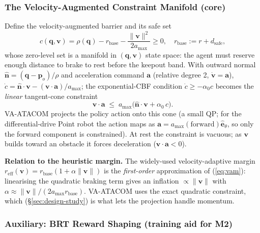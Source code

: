 \documentclass[letterpaper]{article}
\begin{document}
\subsubsection{The Velocity-Augmented Constraint Manifold (core)}

Define the velocity-augmented barrier and its safe set
\begin{equation}
c(\boldsymbol{q},\boldsymbol{v}) = \rho(\boldsymbol{q}) - r_\text{base} - \frac{\|\boldsymbol{v}\|^2}{2a_{\max}} \ge 0,\quad r_\text{base} := r + d_\text{safe},
\label{eq:vam}
\end{equation}
whose zero-level set is a manifold in $(\boldsymbol{q},\boldsymbol{v})$ state space: the agent must reserve enough distance to brake to rest before the keepout band. With outward normal $\hat{\boldsymbol{n}} = (\boldsymbol{q}-\boldsymbol{p}_o)/\rho$ and acceleration command $\boldsymbol{a}$ (relative degree 2, $\dot{\boldsymbol{v}}=\boldsymbol{a}$), $\dot c = \hat{\boldsymbol{n}}\cdot\boldsymbol{v} - (\boldsymbol{v}\cdot\boldsymbol{a})/a_{\max}$; the exponential-CBF condition $\dot c \ge -\alpha_0 c$ becomes the \emph{linear} tangent-cone constraint
\begin{equation}
\boldsymbol{v}\cdot\boldsymbol{a} \;\le\; a_{\max}\bigl(\hat{\boldsymbol{n}}\cdot\boldsymbol{v} + \alpha_0\, c\bigr).
\label{eq:tangent_cone}
\end{equation}
VA-ATACOM projects the policy action onto this cone (a small QP; for the differential-drive Point robot the action maps as $\boldsymbol{a} = a_{\max}(\text{forward})\hat{\boldsymbol{e}}_\theta$, so only the forward component is constrained). At rest the constraint is vacuous; as $\boldsymbol{v}$ builds toward an obstacle it forces deceleration ($\boldsymbol{v}\cdot\boldsymbol{a}<0$).

\textbf{Relation to the heuristic margin.} The widely-used velocity-adaptive margin $r_\text{eff}(\boldsymbol{v}) = r_\text{base}(1+\alpha\|\boldsymbol{v}\|)$ is the \emph{first-order} approximation of (\ref{eq:vam}): linearising the quadratic braking term gives an inflation $\propto \|\boldsymbol{v}\|$ with $\alpha \approx \|\boldsymbol{v}\|/(2a_{\max}r_\text{base})$. VA-ATACOM uses the exact quadratic constraint, which (\S\ref{sec:design-study}) is what lets the projection handle momentum.

\subsubsection{Auxiliary: BRT Reward Shaping (training aid for M2)}
\end{document}
